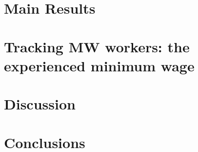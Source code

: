 \documentclass{article}
\begin{document}
\section{Main Results}\label{sec:results}
    

\section{Tracking MW workers: the experienced minimum wage}
	

\section{Discussion}\label{sec:discussion}
	

\section{Conclusions}\label{sec:conclusion}
    

 


\clearpage
\printbibliography


\clearpage

\section*{}
\vspace{5mm}

\appendix

\renewcommand\thetable{\thesection.\arabic{table}}    
\renewcommand\thefigure{\thesection.\arabic{figure}} 
\setcounter{table}{0}
\setcounter{figure}{0}


\end{document}
